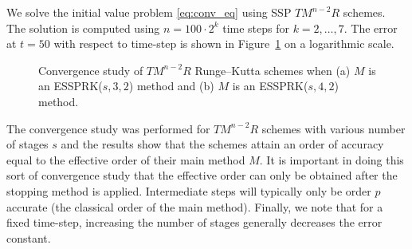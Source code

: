 We solve the initial value problem \eqref{eq:conv_eq}
using SSP $TM^{n-2}R$ schemes.
The solution is computed using $n = 100 \cdot 2^{k}$ time steps for
$k = 2, \dots, 7$.
The error at $t = 50$ with respect to time-step is shown in 
Figure~\ref{fig:conv_study} on a logarithmic scale.
\begin{figure}
	\centering
   \quad
    \caption{Convergence study of $TM^{n-2}R$ Runge--Kutta schemes when (a) $M$
    is an ESSPRK($s,3,2$) method and (b) $ M $ is an ESSPRK($s,4,2$) method.}
    \label{fig:conv_study}
\end{figure}
The convergence study was performed for $TM^{n-2}R$ schemes with
various number of stages $s$ and the results show that the schemes
attain an order of accuracy equal to the effective order of their main
method $M$.
It is important in doing this sort of convergence study that the
effective order can only be obtained after the stopping method is
applied.
Intermediate steps will typically only be order $p$ accurate (the classical
order of the main method).
Finally, we note that for a fixed time-step, increasing the number of stages
generally decreases the error constant.

